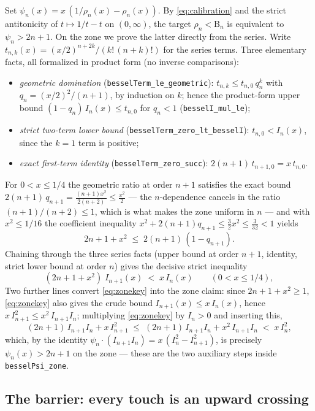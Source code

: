 \documentclass[11pt]{article}
\newcommand{\lean}[1]{\texttt{#1}}
\newcommand{\RHS}{\mathrm{B}}
\begin{document}
Set $\psi_n(x) = x\,(1/\rho_n(x) - \rho_n(x))$.  By
\eqref{eq:calibration} and the strict antitonicity of
$t \mapsto 1/t - t$ on $(0,\infty)$, the target
$\rho_n < \RHS_n$ is equivalent to $\psi_n > 2n+1$.  On the zone we
prove the latter directly from the series.  Write $t_{n,k}(x) =
(x/2)^{n+2k}/(k!\,(n+k)!)$ for the series terms.  Three elementary
facts, all formalized in product form (no inverse comparisons):
\begin{itemize}
\item \emph{geometric domination}
  (\lean{besselTerm\_le\_geometric}): $t_{n,k} \le t_{n,0}\,q_n^k$
  with $q_n = (x/2)^2/(n+1)$, by induction on $k$; hence the
  product-form upper bound $(1-q_n)\,I_n(x) \le t_{n,0}$ for
  $q_n < 1$ (\lean{besselI\_mul\_le});
\item \emph{strict two-term lower bound}
  (\lean{besselTerm\_zero\_lt\_besselI}): $t_{n,0} < I_n(x)$, since
  the $k=1$ term is positive;
\item \emph{exact first-term identity}
  (\lean{besselTerm\_zero\_succ}): $2(n+1)\,t_{n+1,0} = x\,t_{n,0}$.
\end{itemize}
For $0 < x \le 1/4$ the geometric ratio at order $n+1$ satisfies the
exact bound $2(n+1)\,q_{n+1} = \tfrac{(n+1)x^2}{2(n+2)} \le
\tfrac{x^2}{2}$ --- the $n$-dependence cancels in the ratio
$(n+1)/(n+2) \le 1$, which is what makes the zone uniform in $n$ ---
and with $x^2 \le 1/16$ the coefficient inequality
$x^2 + 2(n+1)q_{n+1} \le \tfrac32 x^2 \le \tfrac{3}{32} < 1$ yields
\[
2n+1+x^2 \;\le\; 2(n+1)\,(1-q_{n+1}).
\]
Chaining through the three series facts (upper bound at order $n+1$,
identity, strict lower bound at order $n$) gives the decisive strict
inequality
\begin{equation}\label{eq:zonekey}
(2n+1+x^2)\; I_{n+1}(x) \;<\; x\, I_n(x)
\qquad (0 < x \le 1/4),
\end{equation}
Two further lines convert \eqref{eq:zonekey} into the zone claim:
since $2n+1+x^2 \ge 1$, \eqref{eq:zonekey} also gives the crude
bound $I_{n+1}(x) \le x\,I_n(x)$, hence $x\,I_{n+1}^2 \le
x^2\,I_{n+1}I_n$; multiplying \eqref{eq:zonekey} by $I_n > 0$ and
inserting this,
\[
(2n+1)\,I_{n+1}I_n + x\,I_{n+1}^2 \;\le\;
(2n+1)\,I_{n+1}I_n + x^2\,I_{n+1}I_n \;<\; x\,I_n^2,
\]
which, by the identity $\psi_n \cdot (I_{n+1} I_n) = x\,(I_n^2 -
I_{n+1}^2)$, is precisely $\psi_n(x) > 2n+1$ on the zone --- these
are the two auxiliary steps inside \lean{besselPsi\_zone}.

\subsection{The barrier: every touch is an upward crossing}
\label{sec:barrier}
\end{document}
